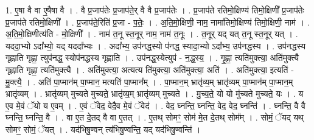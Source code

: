 \documentclass[17pt]{extarticle}
\begin{document}
1. ए॒षा वै वा ए॒षैषा वै । . वै प्र॒जाप॑तेः प्र॒जाप॑ते॒र् वै वै प्र॒जाप॑तेः । . प्र॒जाप॑ते रतिमो॒क्षिण्य॑ तिमो॒क्षिणी᳚ प्र॒जाप॑तेः प्र॒जाप॑ते रतिमो॒क्षिणी᳚ । . प्र॒जाप॑ते॒रिति॑ प्र॒जा - प॒तेः॒ । . अ॒ति॒मो॒क्षिणी॒ नाम॒ नामा॑तिमो॒क्षिण्य॑ तिमो॒क्षिणी॒ नाम॑ । . अ॒ति॒मो॒क्षिणीत्य॑ति - मो॒क्षिणी᳚ । . नाम॑ त॒नू स्त॒नूर् नाम॒ नाम॑ त॒नूः । . त॒नूर् यद् यत् त॒नू स्त॒नूर् यत् । . यददा॒भ्यो ऽदा᳚भ्यो॒ यद् यददा᳚भ्यः । . अदा᳚भ्य॒ उप॑नद्ध॒स्यो प॑नद्ध॒ स्यादा॒भ्यो ऽदा᳚भ्य॒ उप॑नद्धस्य । . उप॑नद्धस्य गृह्णाति गृह्णा॒ त्युप॑नद्ध॒ स्योप॑नद्धस्य गृह्णाति । . उप॑नद्ध॒स्येत्युप॑ - न॒द्ध॒स्य॒ । . गृ॒ह्णा॒ त्यति॑मुक्त्या॒ अति॑मुक्त्यै गृह्णाति गृह्णा॒ त्यति॑मुक्त्यै । . अति॑मुक्त्या॒ अत्यत्य ति॑मुक्त्या॒ अति॑मुक्त्या॒ अति॑ । . अति॑मुक्त्या॒ इत्यति॑ - मु॒क्त्यै॒ । . अति॑ पा॒प्मान॑म् पा॒प्मान॒ मत्यति॑ पा॒प्मान᳚म् । . पा॒प्मान॒म् भ्रातृ॑व्य॒म् भ्रातृ॑व्यम् पा॒प्मान॑म् पा॒प्मान॒म् भ्रातृ॑व्यम् । . भ्रातृ॑व्यम् मुच्यते मुच्यते॒ भ्रातृ॑व्य॒म् भ्रातृ॑व्यम् मुच्यते । . मु॒च्य॒ते॒ यो यो मु॑च्यते मुच्यते॒ यः । . य ए॒व मे॒वं ॅयो य ए॒वम् । . ए॒वं ॅवेद॒ वेदै॒व मे॒वं ॅवेद॑ । . वेद॒ घ्नन्ति॒ घ्नन्ति॒ वेद॒ वेद॒ घ्नन्ति॑ । . घ्नन्ति॒ वै वै घ्नन्ति॒ घ्नन्ति॒ वै । . वा ए॒त दे॒तद् वै वा ए॒तत् । . ए॒तथ् सोमꣳ॒॒ सोम॑ मे॒त दे॒तथ् सोम᳚म् । . सोमं॒ ॅयद् यथ् सोमꣳ॒॒ सोमं॒ ॅयत् । . यद॑भिषु॒ण्वन् त्य॑भिषु॒ण्वन्ति॒ यद् यद॑भिषु॒ण्वन्ति॑ । \newline
\end{document}
